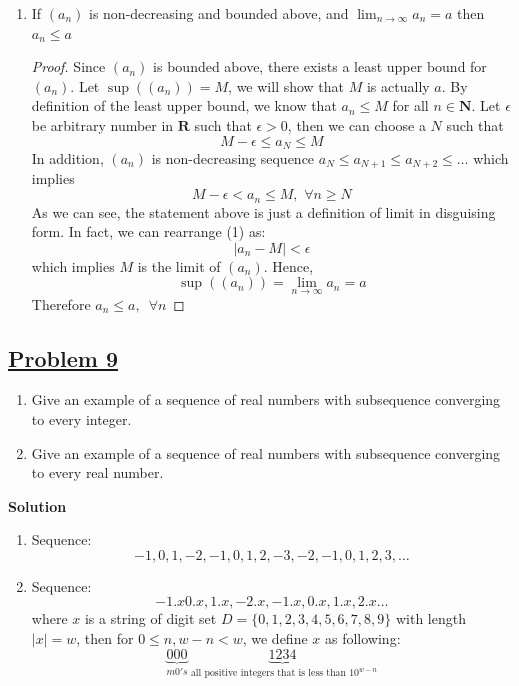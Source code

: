 \documentclass[10pt,letterpaper]{article}
\newcommand{\sol}{\textbf{Solution}}
\begin{document}
\begin{enumerate}[label=(\roman{*})]
		\item If $(a_n)$ is non-decreasing and bounded above, and $\displaystyle\lim_{n\to \infty}a_n = a$ then $a_n \leq a$		
		\begin{proof}
			Since $(a_n)$ is bounded above, there exists a least upper bound for $(a_n)$. Let $\sup((a_n)) = M$, we will
			show that $M$ is actually $a$. 
			By definition of the least upper bound, we know that $a_n \leq M$ for all $n \in \mathbf{N}$.
			Let $\epsilon$ be arbitrary number in $\mathbf{R}$ such that $\epsilon > 0$, then we can choose
			a $N$ such that
			$$M - \epsilon \leq a_N \leq M$$
			In addition, $(a_n)$ is non-decreasing sequence $a_N \leq a_{N + 1} \leq a_{N + 2} \leq \ldots$ 
			which implies 
			\begin{equation}
				M - \epsilon < a_n \leq M, \, \, \forall n \geq N
			\end{equation}
			As we can see, the statement above is just a definition of limit in disguising form. In fact, we
			can rearrange (1) as:
				$$|a_n - M| < \epsilon$$
			which implies $M$ is the limit of $(a_n)$. Hence,
			$$\sup((a_n)) = \displaystyle\lim_{n\to\infty} a_n = a$$
			Therefore $a_n \leq a, \, \, \, \forall n$
		\end{proof}			
	\end{enumerate}
	

	\subsection*{{\color{red}\underline{Problem 9}}}
	\begin{enumerate}[label=(\roman{*})]
		\item Give an example of a sequence of real numbers with subsequence converging to every integer. \\
		\item Give an example of a sequence of real numbers with subsequence converging to every real number.\\
	\end{enumerate}
	\sol 
	\begin{enumerate}[label=(\roman{*})]
		\item Sequence: $$-1, 0, 1, -2, -1, 0, 1, 2, -3, -2, -1, 0, 1, 2, 3, \ldots$$
		\item Sequence: $$-1.x 0.x, 1.x, -2.x, -1.x, 0.x, 1.x, 2.x \ldots$$
		where $x$ is a string of digit set $D = \{0, 1, 2, 3, 4, 5, 6, 7, 8, 9\}$ with length $|x| = w$,
		then for $0 \leq n, w - n < w$, we define $x$ as following:
		$$\underbrace{000}_{m 0's}\underbrace{1234}_{\text{ all positive integers that is less than } 10^{w - n}}$$
	\end{enumerate}
	
\end{document}

